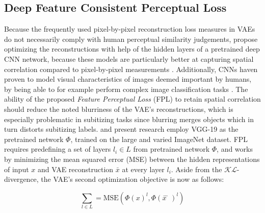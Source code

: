 \documentclass[twocolumn]{article}
\begin{document}
\hypertarget{deep-feature-consistent-perceptual-loss}{%
\subsection{Deep Feature Consistent Perceptual
Loss}\label{deep-feature-consistent-perceptual-loss}}

Because the frequently used pixel-by-pixel reconstruction loss measures
in VAEs do not necessarily comply with human perceptual similarity
judgements, \citet{hou2017deep} propose optimizing the reconstructions
with help of the hidden layers of a pretrained deep CNN network, because
these models are particularly better at capturing spatial correlation
compared to pixel-by-pixel measurements \citep{hou2017deep}.
Additionally, CNNs haven proven to model visual characteristics of
images deemed important by humans, by being able to for example perform
complex image classification tasks \citep{krizhevsky2012imagenet}. The ability
of the proposed \emph{Feature Perceptual Loss} (FPL) to retain spatial
correlation should reduce the noted blurriness
\citep{see for example larsen2015autoencoding} of the VAE's reconstructions, which is
especially problematic in subitizing tasks since blurring merges objects
which in turn distorts subitizing labels. \citet{hou2017deep} and
present research employ VGG-19 \citep{simonyan2014very} as the
pretrained network \(\Phi\), trained on the large and varied ImageNet
\citep{russakovsky2015imagenet} dataset. FPL requires predefining a set
of layers \(l_i \in L\) from pretrained network \(\Phi\), and works by
minimizing the mean squared error (MSE) between the hidden
representations of input \(x\) and VAE reconstruction \(\bar{x}\) at
every layer \(l_i\). Aside from the \(\mathcal{KL}\)-divergence, the
VAE's second optimization objective is now as follows:

\[ \sum_{l \in L}^{} = \textrm{MSE}(\Phi(x)^{l}, \Phi(\bar{x}̄)^{l})\]
\end{document}
